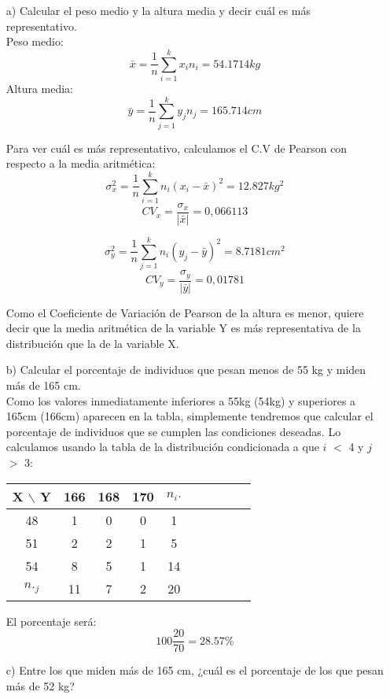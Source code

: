 \documentclass[a4paper,12pt]{article}
\begin{document}
\begin{enumerate}
    \item[a)] Calcular el peso medio y la altura media y decir cuál es más representativo.\\
    Peso medio:
    $$\bar x = \frac {1}{n} \sum\limits_{i = 1}^k {x_i n_i} = 54.1714kg$$
    Altura media:
    $$\bar y = \frac {1}{n} \sum\limits_{j = 1}^k {y_j n_j} = 165.714cm$$

    Para ver cuál es más representativo, calculamos el C.V de Pearson con respecto a la media aritmética:
    $$\sigma_x^2 = {\frac{1}{n}\sum\limits_{i=1}^kn_i(x_i-\bar x)^2} = 12.827kg^2$$
    $$CV_x = \frac {\sigma_x}{|\bar x|} = 0,066113$$

    $$\sigma_y^2 = {\frac{1}{n}\sum\limits_{j=1}^kn_i(y_j-\bar y)^2} = 8.7181cm^2$$
    $$CV_y = \frac {\sigma_y}{|\bar y|} = 0,01781$$

    Como el Coeficiente de Variación de Pearson de la altura es menor, quiere decir que la media aritmética de la variable Y es más representativa de la distribución que la de la variable X.
    
    \item[b)] Calcular el porcentaje de individuos que pesan menos de 55 kg y miden más de 165 cm.\\
    Como los valores inmediatamente inferiores a 55kg (54kg) y superiores a 165cm (166cm) aparecen en la tabla, simplemente tendremos que calcular el porcentaje de individuos que se cumplen las condiciones deseadas.
    Lo calculamos usando la tabla de la distribución condicionada a que $i$ $<$ 4 y $j$ $>$ 3:

    \begin{center}
    \begin{tabular}{c|cccccc|ccc}
    X $\backslash$ Y &166 & 168 & 170 & $n_i.$\\
    \hline
    48 & 1 & 0 & 0 & 1\\
    51 & 2 & 2 & 1 & 5\\
    54 & 8 & 5 & 1 & 14\\
    \hline
    $n._j$ & 11 & 7 & 2 & 20
    \end{tabular}
    \end{center}

    El porcentaje será:
    $$100 \frac{20}{70} = 28.57\%$$
    
    \item[c)] Entre los que miden más de 165 cm, ¿cuál es el porcentaje de los que pesan más de 52 kg?\\


\end{enumerate}
\end{document}

